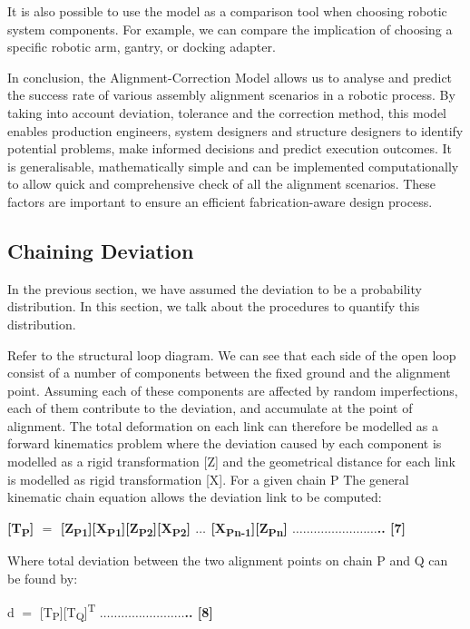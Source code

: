 It is also possible to use the model as a comparison tool when choosing robotic system components. For example, we can compare the implication of choosing a specific robotic arm, gantry, or docking adapter. 

In conclusion, the Alignment-Correction Model allows us to analyse and predict the success rate of various assembly alignment scenarios in a robotic process. By taking into account deviation, tolerance and the correction method, this model enables production engineers, system designers and structure designers to identify potential problems, make informed decisions and predict execution outcomes. It is generalisable, mathematically simple and can be implemented computationally to allow quick and comprehensive check of all the alignment scenarios. These factors are important to ensure an efficient fabrication-aware design process.

\subsection{Chaining Deviation}

In the previous section, we have assumed the deviation to be a probability distribution. In this section, we talk about the procedures to quantify this distribution. 

Refer to the structural loop diagram. We can see that each side of the open loop consist of a number of components between the fixed ground and the alignment point. Assuming each of these components are affected by random imperfections, each of them contribute to the deviation, and accumulate at the point of alignment. The total deformation on each link can therefore be modelled as a forward kinematics problem where the deviation caused by each component is modelled as a rigid transformation [Z] and the geometrical distance for each link is modelled as rigid transformation [X]. For a given chain P The general kinematic chain equation allows the deviation link to be computed:

\textbf{[T\textsubscript{P}] $=$ [Z\textsubscript{P1}][X\textsubscript{P1}][Z\textsubscript{P2}][X\textsubscript{P2}] $\ldots$ [X\textsubscript{Pn-1}][Z\textsubscript{Pn}] $\ldots$$\ldots$$\ldots$$\ldots$$\ldots$$\ldots$$\ldots$$\ldots$.. [7]}

Where total deviation between the two alignment points on chain P and Q can be found by:

d $=$ [T\textsubscript{P}][T\textsubscript{Q}]\textsuperscript{T}\textbf{ $\ldots$$\ldots$$\ldots$$\ldots$$\ldots$$\ldots$$\ldots$$\ldots$.. [8]}

